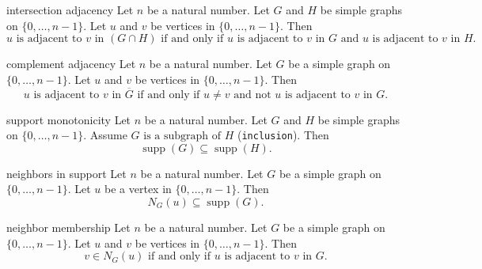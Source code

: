 \begin{cleanresult}{intersection adjacency}
Let $n$ be a natural number.
Let $G$ and $H$ be simple graphs on $\{0,\ldots,n-1\}$.
Let $u$ and $v$ be vertices in $\{0,\ldots,n-1\}$.
Then \[u\text{ is adjacent to }v\text{ in }(G \cap H)\text{ if and only if }u\text{ is adjacent to }v\text{ in }G\text{ and }u\text{ is adjacent to }v\text{ in }H.\]
\end{cleanresult}

\begin{cleanresult}{complement adjacency}
Let $n$ be a natural number.
Let $G$ be a simple graph on $\{0,\ldots,n-1\}$.
Let $u$ and $v$ be vertices in $\{0,\ldots,n-1\}$.
Then \[u\text{ is adjacent to }v\text{ in }\overline{G}\text{ if and only if }u\ne v\text{ and }\text{not }u\text{ is adjacent to }v\text{ in }G.\]
\end{cleanresult}

\begin{cleanresult}{support monotonicity}
Let $n$ be a natural number.
Let $G$ and $H$ be simple graphs on $\{0,\ldots,n-1\}$.
Assume $G\text{ is a subgraph of }H$ (\texttt{inclusion}).
Then \[\operatorname{supp}(G)\subseteq \operatorname{supp}(H).\]
\end{cleanresult}

\begin{cleanresult}{neighbors in support}
Let $n$ be a natural number.
Let $G$ be a simple graph on $\{0,\ldots,n-1\}$.
Let $u$ be a vertex in $\{0,\ldots,n-1\}$.
Then \[N_{G}(u)\subseteq \operatorname{supp}(G).\]
\end{cleanresult}

\begin{cleanresult}{neighbor membership}
Let $n$ be a natural number.
Let $G$ be a simple graph on $\{0,\ldots,n-1\}$.
Let $u$ and $v$ be vertices in $\{0,\ldots,n-1\}$.
Then \[v\in N_{G}(u)\text{ if and only if }u\text{ is adjacent to }v\text{ in }G.\]
\end{cleanresult}

